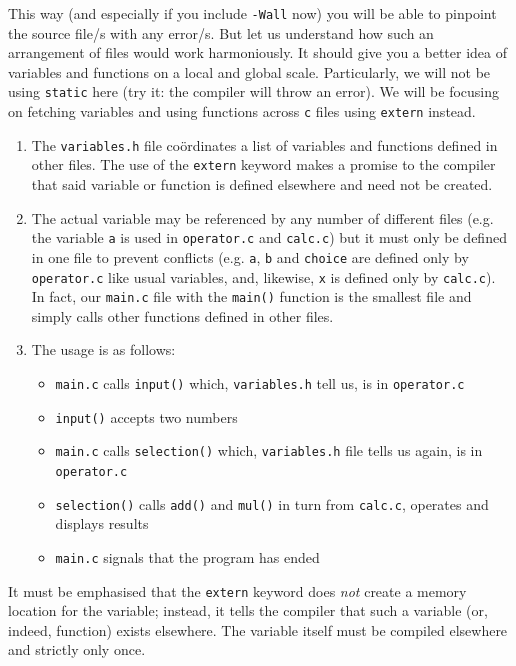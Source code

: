 \documentclass[11pt,oneside]{article}
\begin{document}
{{{{{{{{{{{{This way (and especially if you include \verb+-Wall+ now) you will be able to pinpoint the source file/s with any error/s. But let us understand how such an arrangement of files would work harmoniously. It should give you a better idea of variables and functions on a local and global scale. Particularly, we will not be using \verb+static+ here (try it: the compiler will throw an error). We will be focusing on fetching variables and using functions across \verb+c+ files using \verb+extern+ instead.
\vspace{-0.2cm}
\begin{enumerate}
\itemsep-0.3em
\item The \verb+variables.h+ file co\"{o}rdinates a list of variables and functions defined in other files. The use of the \verb+extern+ keyword makes a promise to the compiler that said variable or function is defined elsewhere and need not be created.
\item The actual variable may be referenced by any number of different files (e.g. the variable \verb+a+ is used in \verb+operator.c+ and \verb+calc.c+) but it must only be defined in one file to prevent conflicts (e.g. \verb+a+, \verb+b+ and \verb+choice+ are defined only by \verb+operator.c+ like usual variables, and, likewise, \verb+x+ is defined only by \verb+calc.c+). In fact, our \verb+main.c+ file with the \verb+main()+ function is the smallest file and simply calls other functions defined in other files.
\item The usage is as follows:\vspace{-0.3cm}
\begin{itemize}
\renewcommand\labelitemi{---}
\itemsep-0.2em
\item \verb+main.c+ calls \verb+input()+ which, \verb+variables.h+ tell us, is in \verb+operator.c+
\item \verb+input()+ accepts two numbers
\item \verb+main.c+ calls \verb+selection()+ which, \verb+variables.h+ file tells us again, is in \verb+operator.c+
\item \verb+selection()+ calls \verb+add()+ and \verb+mul()+ in turn from \verb+calc.c+, operates and displays results
\item \verb+main.c+ signals that the program has ended
\end{itemize}
\end{enumerate}
\vspace{-0.25cm}
It must be emphasised that the \verb+extern+ keyword does \textit{not} create a memory location for the variable; instead, it tells the compiler that such a variable (or, indeed, function) exists elsewhere. The variable itself must be compiled elsewhere and strictly only once.

}}}}}}}}}}}}
\end{document}
